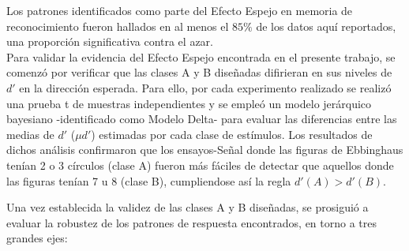 Los patrones identificados como parte del Efecto Espejo en memoria de reconocimiento fueron hallados en al menos el $85\%$ de los datos aquí reportados, una proporción significativa contra el azar.\\

Para validar la evidencia del Efecto Espejo encontrada en el presente trabajo, se comenzó por verificar que las clases A y B diseñadas difirieran en sus niveles de $d'$ en la dirección esperada. Para ello, por cada experimento realizado se realizó una prueba t de muestras independientes y se empleó un modelo jerárquico bayesiano -identificado como Modelo Delta- para evaluar las diferencias entre las medias de $d'$  ($\mu d'$) estimadas por cada clase de estímulos. Los resultados de dichos análisis confirmaron que los ensayos-Señal donde las figuras de Ebbinghaus tenían 2 o 3 círculos (clase A) fueron más fáciles de detectar que aquellos donde las figuras tenían 7 u 8 (clase B), cumpliendose así la regla $d'(A) > d'(B)$.


Una vez establecida la validez de las clases A y B diseñadas, se prosiguió a evaluar la robustez de los patrones de respuesta encontrados, en torno a tres grandes ejes:

